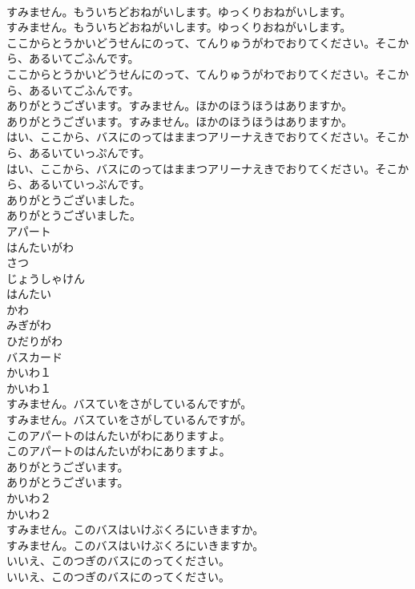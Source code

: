 \documentclass[8pt]{extreport}
\begin{document}
\begin{CJK}{UTF8}{min}
\\	すみません。もういちどおねがいします。ゆっくりおねがいします。	
\\	すみません。もういちどおねがいします。ゆっくりおねがいします。 
\\	ここからとうかいどうせんにのって、てんりゅうがわでおりてください。そこから、あるいてごふんです。	
\\	ここからとうかいどうせんにのって、てんりゅうがわでおりてください。そこから、あるいてごふんです。 
\\	ありがとうございます。すみません。ほかのほうほうはありますか。	
\\	ありがとうございます。すみません。ほかのほうほうはありますか。 
\\	はい、ここから、バスにのってはままつアリーナえきでおりてください。そこから、あるいていっぷんです。	
\\	はい、ここから、バスにのってはままつアリーナえきでおりてください。そこから、あるいていっぷんです。 
\\	ありがとうございました。	
\\	ありがとうございました。 
\\	アパート
\\	はんたいがわ
\\	さつ
\\	じょうしゃけん
\\	はんたい
\\	かわ
\\	みぎがわ
\\	ひだりがわ
\\	バスカード
\\	かいわ１	
\\	かいわ１ 
\\	すみません。バスていをさがしているんですが。	
\\	すみません。バスていをさがしているんですが。 
\\	このアパートのはんたいがわにありますよ。	
\\	このアパートのはんたいがわにありますよ。 
\\	ありがとうございます。	
\\	ありがとうございます。 
\\	かいわ２	
\\	かいわ２ 
\\	すみません。このバスはいけぶくろにいきますか。	
\\	すみません。このバスはいけぶくろにいきますか。 
\\	いいえ、このつぎのバスにのってください。	
\\	いいえ、このつぎのバスにのってください。 

\end{CJK}
\end{document}
